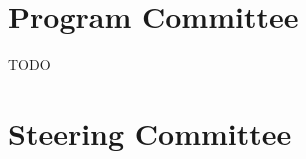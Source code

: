 \documentclass[acmlarge,nonacm]{acmart}
\begin{document}
\section*{Program Committee}
TODO
\begin{itemize}
\end{itemize}



\section*{Steering Committee}
\end{document}
